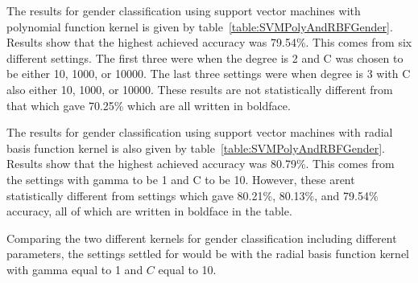 \documentclass[a4paper]{llncs}
\begin{document}
  
 
The results for gender classification using support vector machines with polynomial function kernel is given by table~\ref{table:SVMPolyAndRBFGender}. Results show  that the highest achieved accuracy was 79.54\%. This comes from six different settings. The first three were when the degree is 2 and C was chosen to be either 10, 1000, or 10000. The last three settings were when degree is 3 with C also either 10, 1000, or 10000. These results are not statistically different from that which gave 70.25\% which are all written in boldface. 


The results for gender classification using support vector machines with radial basis function kernel is also given by table~\ref{table:SVMPolyAndRBFGender}. Results show  that the highest achieved accuracy was 80.79\%. This comes from the settings with gamma to be 1 and C to be 10. However, these arent statistically different from settings which gave 80.21\%, 80.13\%, and 79.54\% accuracy, all of which are written in boldface in the table.

Comparing the two different kernels for gender classification including different parameters, the settings settled for would be with the radial basis function kernel with gamma equal to 1 and $C$ equal to 10.  
\end{document}

